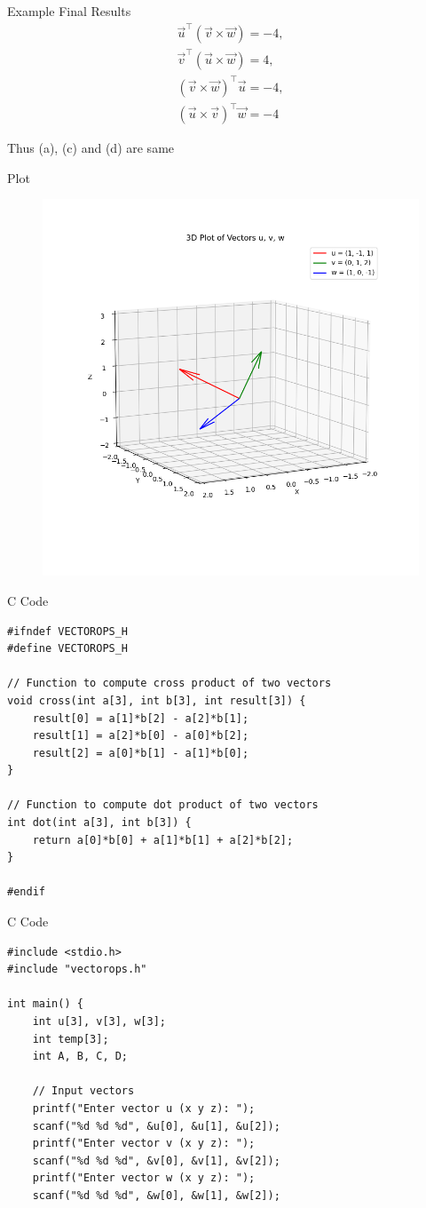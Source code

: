 \documentclass{beamer}
\begin{document}
\begin{frame}{Example}
    Final Results
\begin{align}
\vec{u}^\top(\vec{v}\times \vec{w})=-4, \\ 
\vec{v}^\top(\vec{u}\times \vec{w})=4, \\ 
(\vec{v}\times \vec{w})^\top \vec{u}=-4, \\ 
(\vec{u}\times \vec{v})^\top \vec{w}=-4
\end{align}

Thus (a), (c) and (d) are same
\end{frame}

\begin{frame}{Plot}

    \begin{figure}
        \centering
        \includegraphics[width=0.5\linewidth]{figs/plot5.png}
        \caption{}
        \label{fig:placeholder}
    \end{figure}
\end{frame}

\begin{frame}[fragile]{C Code}
    \begin{verbatim}
#ifndef VECTOROPS_H
#define VECTOROPS_H

// Function to compute cross product of two vectors
void cross(int a[3], int b[3], int result[3]) {
    result[0] = a[1]*b[2] - a[2]*b[1];
    result[1] = a[2]*b[0] - a[0]*b[2];
    result[2] = a[0]*b[1] - a[1]*b[0];
}

// Function to compute dot product of two vectors
int dot(int a[3], int b[3]) {
    return a[0]*b[0] + a[1]*b[1] + a[2]*b[2];
}

#endif
    \end{verbatim}
\end{frame}

\begin{frame}[fragile]{C Code}
    \begin{verbatim}
#include <stdio.h>
#include "vectorops.h"

int main() {
    int u[3], v[3], w[3];
    int temp[3];
    int A, B, C, D;

    // Input vectors
    printf("Enter vector u (x y z): ");
    scanf("%d %d %d", &u[0], &u[1], &u[2]);
    printf("Enter vector v (x y z): ");
    scanf("%d %d %d", &v[0], &v[1], &v[2]);
    printf("Enter vector w (x y z): ");
    scanf("%d %d %d", &w[0], &w[1], &w[2]);
    \end{verbatim}
\end{frame}
\end{document}
